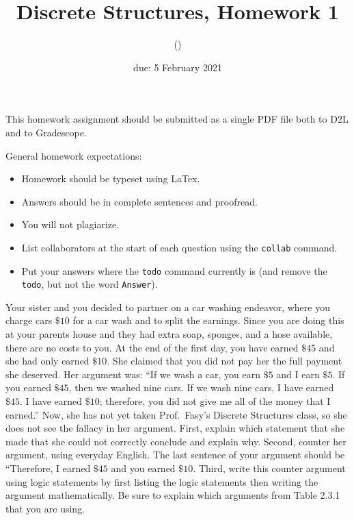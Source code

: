 \documentclass{article}
\title{Discrete Structures, Homework 1}
\author{\todo{Your Name Here} (\todo{your discord handle here})}
\date{due: 5 February 2021}
\begin{document}
\maketitle

This homework assignment should be
submitted as a single PDF file both to D2L and to Gradescope.

General homework expectations:
\begin{itemize}
    \item Homework should be typeset using LaTex.
    \item Answers should be in complete sentences and proofread.
    \item You will not plagiarize.  \item List collaborators at the start of each question using the \texttt{collab} command.
    \item Put your answers where the \texttt{todo} command currently is (and
        remove the \texttt{todo}, but not the word \texttt{Answer}).
\end{itemize}

 
Your sister and you decided to partner on a car washing endeavor, where you
charge cars $\$10$ for a car wash and to split the earnings.  Since you are
doing this at your parents house and they had extra soap, sponges, and a hose
available, there are no costs to you.  At the end of the first day, you have
earned $\$45$ and she had only earned $\$10$. She claimed that you did not pay
her the full payment she deserved. Her argument was: ``If we wash a car, you
earn $\$5$ and I earn $\$5$.  If you earned $\$45$, then we washed nine cars.  If
we wash nine cars, I have earned $\$45$.  I have earned $\$10$; therefore, you
did not give me all of the money that I earned.''  Now, she has not yet taken
Prof.~Fasy's Discrete Structures class, so she does not see the fallacy in her
argument. First, explain which statement that she made that she could not
correctly conclude and explain why.  Second, counter her argument, using
everyday English. The last sentence of your argument should be ``Therefore, I
earned $\$45$ and you earned $\$10$. Third, write this counter argument using
logic statements by first listing the logic statements then writing the argument
mathematically.  Be sure to explain which arguments from Table 2.3.1 that you
are using.
\end{document}
